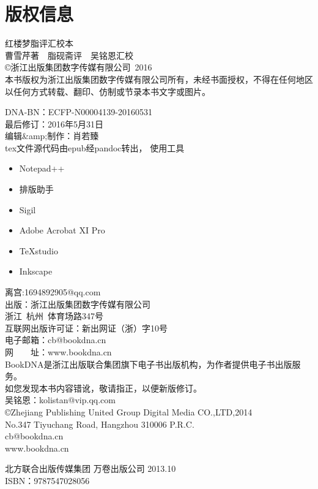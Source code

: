 \chapter{版权信息}
\begin{flushleft}
	
{红楼梦脂评汇校本}\\
曹雪芹著~~脂砚斋评~~吴铭恩汇校\\[2\baselineskip]\copyright 浙江出版集团数字传媒有限公司~2016\\
本书版权为浙江出版集团数字传媒有限公司所有，未经书面授权，不得在任何地区以任何方式转载、翻印、仿制或节录本书文字或图片。

DNA-BN：ECFP-N00004139-20160531\\
最后修订：2016年5月31日\\
编辑\&amp;制作：{肖若臻}\\

tex文件源代码由epub经pandoc转出，
使用工具
\begin{itemize}
	\item Notepad++
	\item 排版助手
	\item Sigil
	\item Adobe Acrobat XI Pro
	\item TeXstudio
	\item Inkscape
\end{itemize}
离宫:1694892905@qq.com\\

出版：浙江出版集团数字传媒有限公司\\
浙江~杭州~体育场路347号\\
互联网出版许可证：新出网证（浙）字10号\\
电子邮箱：cb@bookdna.cn\\
网　　址：www.bookdna.cn\\
BookDNA是浙江出版联合集团旗下电子书出版机构，为作者提供电子书出版服务。\\
如您发现本书内容错讹，敬请指正，以便新版修订。\\
吴铭恩：kolistan@vip.qq.com\\

\copyright Zhejiang Publishing United Group Digital Media CO.,LTD,2014\\
No.347 Tiyuchang Road, Hangzhou 310006 P.R.C.\\
cb@bookdna.cn\\
www.bookdna.cn

北方联合出版传媒集团 万卷出版公司 2013.10\\
ISBN：9787547028056
\end{flushleft}
